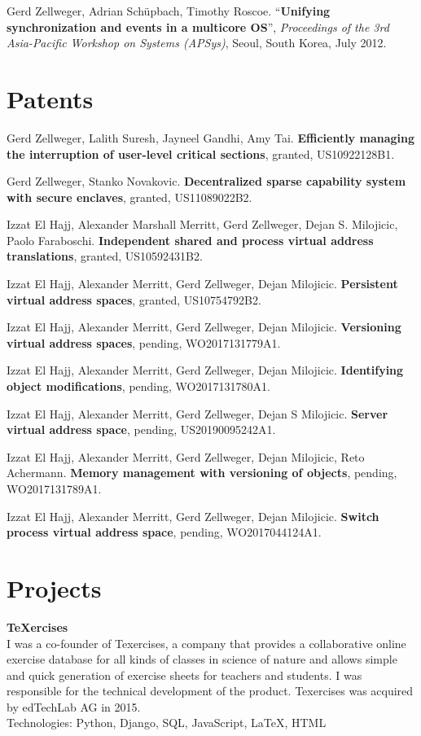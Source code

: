 \documentclass[margin,line]{cv/cv}
\begin{document}
\begin{resume}
    Gerd Zellweger, Adrian Schüpbach, Timothy Roscoe.
    ``\textbf{Unifying synchronization and events in a multicore OS}'',
    \textsl{Proceedings of the 3rd Asia-Pacific Workshop on Systems (APSys)}, Seoul, South Korea, July 2012.


    \pagebreak

    \section{\mysidestyle Patents}

    Gerd Zellweger, Lalith Suresh, Jayneel Gandhi, Amy Tai.
    \textbf{Efficiently managing the interruption of user-level critical sections},
    granted, US10922128B1.

    Gerd Zellweger, Stanko Novakovic.
    \textbf{Decentralized sparse capability system with secure enclaves},
    granted, US11089022B2.

    Izzat El Hajj, Alexander Marshall Merritt, Gerd Zellweger, Dejan S. Milojicic, Paolo Faraboschi.
    \textbf{Independent shared and process virtual address translations},
    granted, US10592431B2.

    Izzat El Hajj, Alexander Merritt, Gerd Zellweger, Dejan Milojicic.
    \textbf{Persistent virtual address spaces},
    granted, US10754792B2.

    Izzat El Hajj, Alexander Merritt, Gerd Zellweger, Dejan Milojicic.
    \textbf{Versioning virtual address spaces},
    pending, WO2017131779A1.

    Izzat El Hajj, Alexander Merritt, Gerd Zellweger, Dejan Milojicic.
    \textbf{Identifying object modifications},
    pending, WO2017131780A1.

    Izzat El Hajj, Alexander Merritt, Gerd Zellweger, Dejan S Milojicic.
    \textbf{Server virtual address space},
    pending, US20190095242A1.

    Izzat El Hajj, Alexander Merritt, Gerd Zellweger, Dejan Milojicic, Reto Achermann.
    \textbf{Memory management with versioning of objects},
    pending, WO2017131789A1.

    Izzat El Hajj, Alexander Merritt, Gerd Zellweger, Dejan Milojicic.
    \textbf{Switch process virtual address space},
    pending, WO2017044124A1.


    \section{\mysidestyle Projects}
    \textbf{{\TeX}ercises} \\\vspace{1mm}%
    I was a co-founder of Texercises, a company that provides a collaborative online
    exercise database for all kinds of classes in science of nature and allows
    simple and quick generation of exercise sheets for teachers and students. I was
    responsible for the technical development of the product. Texercises was
    acquired by edTechLab AG in 2015.\\
    Technologies: Python, Django, SQL, JavaScript, LaTeX, HTML


\end{resume}
\end{document}

